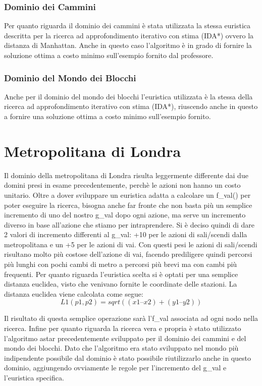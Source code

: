 \subsection{Dominio dei Cammini}

Per quanto riguarda il dominio dei cammini è stata utilizzata la stessa euristica descritta per la ricerca ad approfondimento iterativo con stima (IDA*) ovvero la distanza di Manhattan. Anche in questo caso l'algoritmo è in grado di fornire la soluzione ottima a costo minimo sull'esempio fornito dal professore.

\subsection{Dominio del Mondo dei Blocchi}

Anche per il dominio del mondo dei blocchi l'euristica utilizzata è la stessa della ricerca ad approfondimento iterativo con stima (IDA*), riuscendo anche in questo a fornire una soluzione ottima a costo minimo sull'esempio fornito.

\chapter{Metropolitana di Londra}

Il dominio della metropolitana di Londra risulta leggermente differente dai due domini presi in esame precedentemente, perchè le azioni non hanno un costo unitario. Oltre a dover sviluppare un euristica adatta a calcolare un f_val() per poter eseguire la ricerca, bisogna anche far fronte che non basta più un semplice incremento di uno del nostro g_val dopo ogni azione, ma serve un incremento diverso in base all'azione che stiamo per intraprendere. Si è deciso quindi di dare 2 valori di incremento differenti al g_val: +10 per le azioni di sali/scendi dalla metropolitana e un +5 per le azioni di vai. Con questi pesi le azioni di sali/scendi risultano molto più costose dell'azione di vai, facendo prediligere quindi percorsi più lunghi con pochi cambi di metro a percorsi più brevi ma con cambi più frequenti.
Per quanto riguarda l'euristica scelta si è optati per una semplice distanza euclidea, visto che venivano fornite le coordinate delle stazioni. La distanza euclidea viene calcolata come segue:
$$L1(p1,p2) = sqrt((x1 – x2)+(y1 – y2))$$

Il risultato di questa semplice operazione sarà l'f_val associata ad ogni nodo nella ricerca.
Infine per quanto riguarda la ricerca vera e propria è stato utilizzato l'algoritmo astar precedentemente sviluppato per il dominio dei cammini e del mondo dei blocchi.
Dato che l'algoritmo era stato sviluppato nel mondo più indipendente possibile dal dominio è stato possibile riutilizzarlo anche in questo dominio, aggiungendo ovviamente le regole per l'incremento del g_val e l'euristica specifica.
